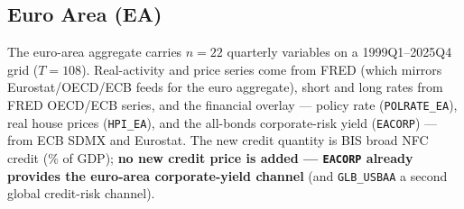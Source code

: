 \subsection{Euro Area (EA)}\label{sec:data-ea}

The euro-area aggregate carries $n=22$ quarterly variables on a
1999Q1--2025Q4 grid ($T=108$). Real-activity and price series come from
FRED (which mirrors Eurostat/OECD/ECB feeds for the euro aggregate),
short and long rates from FRED OECD/ECB series, and the financial overlay
--- policy rate (\texttt{POLRATE\_EA}), real house prices
(\texttt{HPI\_EA}), and the all-bonds corporate-risk yield
(\texttt{EACORP}) --- from ECB SDMX and Eurostat. The new credit quantity
is BIS broad NFC credit (\% of GDP); \textbf{no new credit price is added
--- \texttt{EACORP} already provides the euro-area corporate-yield
channel} (and \texttt{GLB\_USBAA} a second global credit-risk channel).

